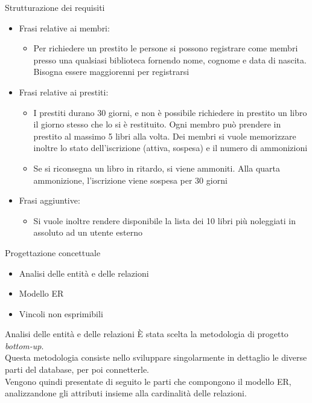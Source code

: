 \begin{frame}{Strutturazione dei requisiti}
    \begin{itemize}
        \item Frasi relative ai membri:
            \begin{itemize}
                \item Per richiedere un prestito le persone si possono registrare come membri presso una qualsiasi biblioteca fornendo nome, cognome e data di nascita. Bisogna essere maggiorenni per registrarsi
            \end{itemize}
        \item Frasi relative ai prestiti:
            \begin{itemize}
                \item I prestiti durano 30 giorni, e non è possibile richiedere in prestito un libro il giorno stesso che lo si è restituito. Ogni membro può prendere in prestito al massimo 5 libri alla volta. Dei membri si vuole memorizzare inoltre lo stato dell'iscrizione (attiva, sospesa) e il numero di ammonizioni

                \item Se si riconsegna un libro in ritardo, si viene ammoniti. Alla quarta ammonizione, l'iscrizione viene sospesa per 30 giorni
            \end{itemize}
        \item Frasi aggiuntive:
            \begin{itemize}
                \item Si vuole inoltre rendere disponibile la lista dei 10 libri più noleggiati in assoluto ad un utente esterno
            \end{itemize}
    \end{itemize}
\end{frame}

\begin{frame}{Progettazione concettuale}
    \begin{itemize}
        \item Analisi delle entità e delle relazioni
        \item Modello ER
        \item Vincoli non esprimibili
    \end{itemize}
\end{frame}

\begin{frame}{Analisi delle entità e delle relazioni}
    È stata scelta la metodologia di progetto \emph{bottom-up}. \\

    Questa metodologia consiste nello sviluppare singolarmente in dettaglio le diverse parti del database, per poi connetterle. \\

    Vengono quindi presentate di seguito le parti che compongono il modello ER, analizzandone gli attributi insieme alla cardinalità delle relazioni.
\end{frame}


